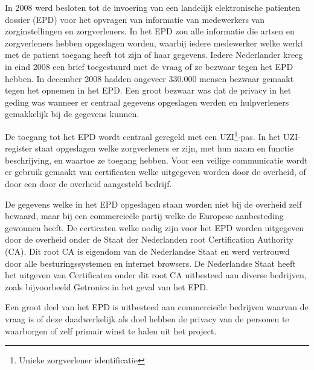 In 2008 werd besloten tot de invoering van een landelijk elektronische patienten dossier (EPD) voor het opvragen van informatie van medewerkers van zorginstellingen en zorgverleners. In het EPD zou alle informatie die artsen en zorgverleners hebben opgeslagen worden, waarbij iedere medewerker welke werkt met de patient toegang heeft tot zijn of haar gegevens. Iedere Nederlander kreeg in eind 2008 een brief toegestuurd met de vraag of ze bezwaar tegen het EPD hebben. In december 2008 hadden ongeveer 330.000 mensen bezwaar gemaakt tegen het opnemen in het EPD\cite{bib.minvws.epdbezwaar}. Een groot bezwaar was dat de privacy in het geding was wanneer er centraal gegevens opgeslagen werden en hulpverleners gemakkelijk bij de gegevens kunnen.

De toegang tot het EPD wordt centraal geregeld met een UZI\footnote{Unieke zorgverlener identificatie}-pas. In het UZI-register staat opgeslagen welke zorgverleners er zijn, met hun naam en functie beschrijving, en waartoe ze toegang hebben. Voor een veilige communicatie wordt er gebruik gemaakt van certificaten welke uitgegeven worden door de overheid, of door een door de overheid aangesteld bedrijf.

De gegevens welke in het EPD opgeslagen staan worden niet bij de overheid zelf bewaard, maar bij een commercie\"{e}le partij welke de Europese aanbesteding gewonnen heeft. 
De certicaten welke nodig zijn voor het EPD worden uitgegeven door de overheid onder de Staat der Nederlanden root Certification Authority (CA). Dit root CA is eigendom van de Nederlandse Staat en werd vertrouwd door alle besturingssystemen en internet browsers. De Nederlandse Staat heeft het uitgeven van Certificaten onder dit root CA uitbesteed aan diverse bedrijven, zoals bijvoorbeeld Getronics in het geval van het EPD\cite{bib.minvws.CPSUZI}.

Een groot deel van het EPD is uitbesteed aan commercie\"{e}le bedrijven waarvan de vraag is of deze daadwerkelijk als doel hebben de privacy van de personen te waarborgen of zelf primair winst te halen uit het project. 
